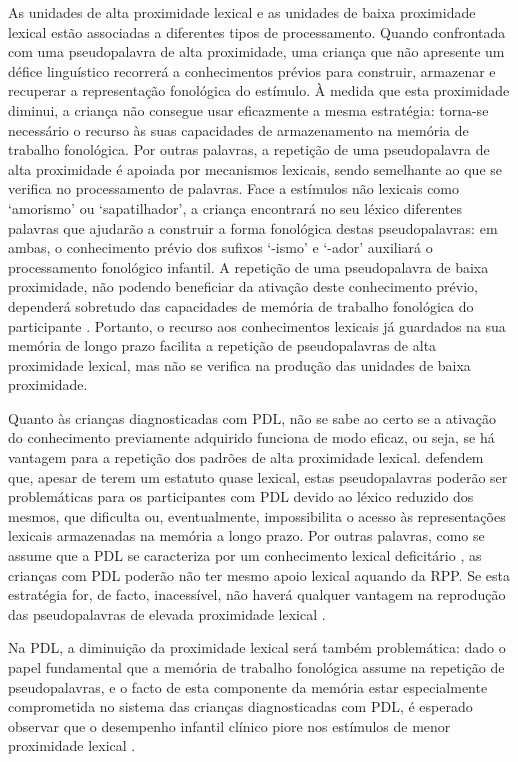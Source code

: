 \documentclass[output=paper,colorlinks,citecolor=brown,booklanguage=portuguese]{langscibook}
\begin{document}
As unidades de alta proximidade lexical e as unidades de baixa proximidade lexical estão associadas a diferentes tipos de processamento. Quando confrontada com uma pseudopalavra de alta proximidade, uma criança que não apresente um défice linguístico recorrerá a conhecimentos prévios para construir, armazenar e recuperar a representação fonológica do estímulo. À medida que esta proximidade diminui, a criança não consegue usar eficazmente a mesma estratégia: torna-se necessário o recurso às suas capacidades de armazenamento na memória de trabalho fonológica. Por outras palavras, a repetição de uma pseudopalavra de alta proximidade é apoiada por mecanismos lexicais, sendo semelhante ao que se verifica no processamento de palavras. Face a estímulos não lexicais como ‘amorismo’ ou ‘sapatilhador’, a criança encontrará no seu léxico diferentes palavras que ajudarão a construir a forma fonológica destas pseudopalavras: em ambas, o conhecimento prévio dos sufixos ‘-ismo’ e ‘-ador’ auxiliará o processamento fonológico infantil. A repetição de uma pseudopalavra de baixa proximidade, não podendo beneficiar da ativação deste conhecimento prévio, dependerá sobretudo das capacidades de memória de trabalho fonológica do participante \citep{Casalini2007, Gathercole1995}. Portanto, o recurso aos conhecimentos lexicais já guardados na sua memória de longo prazo facilita a repetição de pseudopalavras de alta proximidade lexical, mas não se verifica na produção das unidades de baixa proximidade.

Quanto às crianças diagnosticadas com PDL, não se sabe ao certo se a ativação do conhecimento previamente adquirido funciona de modo eficaz, ou seja, se há vantagem para a repetição dos padrões de alta proximidade lexical. \citet{Estes2007} defendem que, apesar de terem um estatuto quase lexical, estas pseudopalavras poderão ser problemáticas para os participantes com PDL devido ao léxico reduzido dos mesmos, que dificulta ou, eventualmente, impossibilita o acesso às representações lexicais armazenadas na memória a longo prazo. Por outras palavras, como se assume que a PDL se caracteriza por um conhecimento lexical deficitário \citep{Edwards2004, Munson2005}, as crianças com PDL poderão não ter mesmo apoio lexical aquando da RPP. Se esta estratégia for, de facto, inacessível, não haverá qualquer vantagem na reprodução das pseudopalavras de elevada proximidade lexical \citep{Estes2007}.

Na PDL, a diminuição da proximidade lexical será também problemática: dado o papel fundamental que a memória de trabalho fonológica assume na repetição de pseudopalavras, e o facto de esta componente da memória estar especialmente comprometida no sistema das crianças diagnosticadas com PDL, é esperado observar que o desempenho infantil clínico piore nos estímulos de menor proximidade lexical \citep{Estes2007}.
\end{document}
